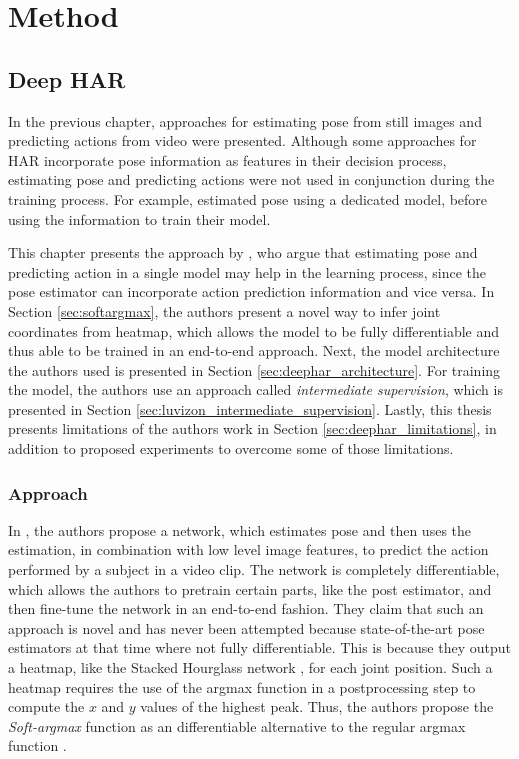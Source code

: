 \chapter{Method}
\section{Deep HAR}

In the previous chapter, approaches for estimating pose from still images and predicting actions from video were presented.
Although some approaches for HAR incorporate pose information as features in their decision process, estimating pose and predicting actions were not used in conjunction during the training process.
For example, \cite{choutas_potion:_2018}  estimated pose using a dedicated model, before using the information to train their model. 

This chapter presents the approach by \cite{luvizon_2d/3d_2018}, who argue that estimating pose and predicting action in a single model may help in the learning process, since the pose estimator can incorporate action prediction information and vice versa.
In Section \ref{sec:softargmax}, the authors present a novel way to infer joint coordinates from heatmap, which allows the model to be fully differentiable and thus able to be trained in an end-to-end approach.
Next, the model architecture the authors used is presented in Section \ref{sec:deephar_architecture}.
For training the model, the authors use an approach called \textit{intermediate supervision}, which is presented in Section \ref{sec:luvizon_intermediate_supervision}.
Lastly, this thesis presents limitations of the authors work in Section \ref{sec:deephar_limitations}, in addition to proposed experiments to overcome some of those limitations.

\subsection{Approach}
\label{sec:deephar_approach}

In \cite{luvizon_2d/3d_2018}, the authors propose a network, which estimates pose and then uses the estimation, in combination with low level image features, to predict the action performed by a subject in a video clip.
The network is completely differentiable, which allows the authors to pretrain certain parts, like the post estimator, and then fine-tune the network in an end-to-end fashion.
They claim that such an approach is novel and has never been attempted because state-of-the-art pose estimators at that time where not fully differentiable.
This is because they output a heatmap, like the Stacked Hourglass network \cite{newell_stacked_2016} , for each joint position.
Such a heatmap requires the use of the argmax function in a postprocessing step to compute the $x$ and $y$ values of the highest peak.
Thus, the authors propose the \textit{Soft-argmax} function as an differentiable alternative to the regular argmax function .

